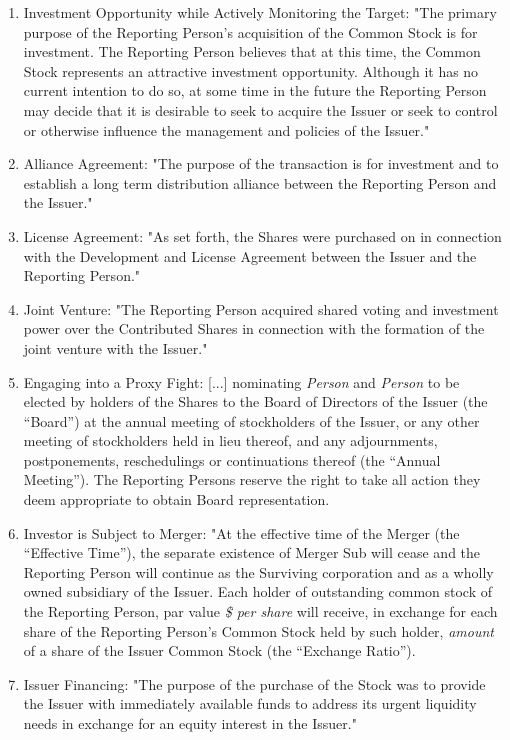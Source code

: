 \documentclass[12pt]{article}
\begin{document}
\begin{appendices}
\begin{enumerate}
\item Investment Opportunity while Actively Monitoring the Target: "The primary purpose of the Reporting Person's acquisition of the Common Stock is for investment. The Reporting Person believes that at this time, the Common Stock represents an attractive investment opportunity. Although it has no current intention to do so, at some time in the future the Reporting Person may decide that it is desirable to seek to acquire the Issuer or seek to control or otherwise influence the management and policies of the Issuer."

\item Alliance Agreement: "The purpose of the transaction is for investment and to establish a long term distribution alliance between the Reporting Person and the Issuer."

\item License Agreement: "As set forth, the Shares were purchased on  in connection with the Development and License Agreement between the Issuer and the Reporting Person."

\item Joint Venture: "The Reporting Person acquired shared voting and investment power over the Contributed Shares in connection with the formation of the joint venture with the Issuer."

\item Engaging into a Proxy Fight: [...] nominating \emph{Person} and \emph{Person} to be elected by holders of the Shares to the Board of Directors of the Issuer (the “Board”) at the annual meeting of stockholders of the Issuer, or any other meeting of stockholders held in lieu thereof, and any adjournments, postponements, reschedulings or continuations thereof (the “Annual Meeting”). The Reporting Persons reserve the right to take all action they deem appropriate to obtain Board representation. 

\item Investor is Subject to Merger: "At the effective time of the Merger (the “Effective Time”), the separate existence of Merger Sub will cease and the Reporting Person will continue as the Surviving corporation and as a wholly owned subsidiary of the Issuer. Each holder of outstanding common stock of the Reporting Person, par value \emph{\$ per share} will receive, in exchange for each share of the Reporting Person's Common Stock held by such holder, \emph{amount} of a share of the Issuer Common Stock (the “Exchange Ratio”).

\item Issuer Financing: "The purpose of the purchase of the Stock was to provide the Issuer with immediately available funds to address its urgent liquidity needs in exchange for an equity interest in the Issuer."
\end{enumerate}


\end{appendices}
\end{document}
